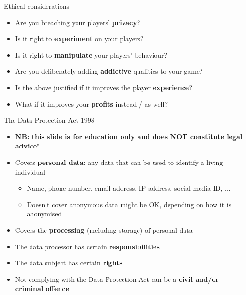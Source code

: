 \begin{frame}{Ethical considerations}
	\begin{itemize}
		\pause\item Are you breaching your players' \textbf{privacy}?
		\pause\item Is it right to \textbf{experiment} on your players?
		\pause\item Is it right to \textbf{manipulate} your players' behaviour?
		\pause\item Are you deliberately adding \textbf{addictive} qualities to your game?
		\pause\item Is the above justified if it improves the player \textbf{experience}?
		\pause\item What if it improves your \textbf{profits} instead / as well?
	\end{itemize}
\end{frame}

\begin{frame}{The Data Protection Act 1998}
	\begin{itemize}
		\pause\item \textbf{NB: this slide is for education only and does NOT constitute legal advice!}
		\pause\item Covers \textbf{personal data}: any data that can be used to identify a living individual
			\begin{itemize}
				\pause\item Name, phone number, email address, IP address, social media ID, ...
				\pause\item Doesn't cover anonymous data might be OK, depending on how it is anonymised
			\end{itemize}
		\pause\item Covers the \textbf{processing} (including storage) of personal data
		\pause\item The data processor has certain \textbf{responsibilities}
		\pause\item The data subject has certain \textbf{rights}
		\pause\item Not complying with the Data Protection Act can be a \textbf{civil and/or criminal offence}
	\end{itemize}
\end{frame}
